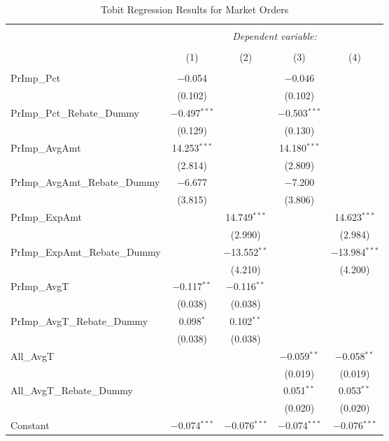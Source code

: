 \documentclass[11pt,a4paper]{article}
\begin{document}
\begin{table}[!htbp] 
	\captionsetup{font=normal}
	\caption{Tobit Regression Results for Market Orders} 
	\label{} 
	\centering
	\small
	\begin{tabular}{@{\extracolsep{1em}}lcccc} 
		\\[-1.8ex]\hline  
		\hline \\[-1.8ex]  
		& \multicolumn{4}{c}{\textit{Dependent variable:}} \\  
		\cline{2-5}  
		\\[-1.8ex] & (1) & (2) & (3) & (4)\\  
		\hline \\[-1.8ex]  
		PrImp\_Pct & $-$0.054 &  & $-$0.046 &  \\  
		& (0.102) &  & (0.102) &  \\  [1.5ex]
		PrImp\_Pct\_Rebate\_Dummy & $-$0.497$^{***}$ &  & $-$0.503$^{***}$ &  \\  
		& (0.129) &  & (0.130) &  \\  [1.5ex]
		PrImp\_AvgAmt & 14.253$^{***}$ &  & 14.180$^{***}$ &  \\  
		& (2.814) &  & (2.809) &  \\  [1.5ex]
		PrImp\_AvgAmt\_Rebate\_Dummy & $-$6.677 &  & $-$7.200 &  \\  
		& (3.815) &  & (3.806) &  \\  [1.5ex]
		PrImp\_ExpAmt &  & 14.749$^{***}$ &  & 14.623$^{***}$ \\  
		&  & (2.990) &  & (2.984) \\ [1.5ex]
		PrImp\_ExpAmt\_Rebate\_Dummy &  & $-$13.552$^{**}$ &  & $-$13.984$^{***}$ \\  
		&  & (4.210) &  & (4.200) \\  [1.5ex]
		PrImp\_AvgT & $-$0.117$^{**}$ & $-$0.116$^{**}$ &  &  \\  
		& (0.038) & (0.038) &  &  \\  [1.5ex]
		PrImp\_AvgT\_Rebate\_Dummy & 0.098$^{*}$ & 0.102$^{**}$ &  &  \\  
		& (0.038) & (0.038) &  &  \\  [1.5ex]
		All\_AvgT &  &  & $-$0.059$^{**}$ & $-$0.058$^{**}$ \\  
		&  &  & (0.019) & (0.019) \\  [1.5ex]
		All\_AvgT\_Rebate\_Dummy &  &  & 0.051$^{**}$ & 0.053$^{**}$ \\  
		&  &  & (0.020) & (0.020) \\  [1.5ex]
		Constant & $-$0.074$^{***}$ & $-$0.076$^{***}$ & $-$0.074$^{***}$ & $-$0.076$^{***}$ \\  

\end{tabular}
\end{table}
\end{document}
